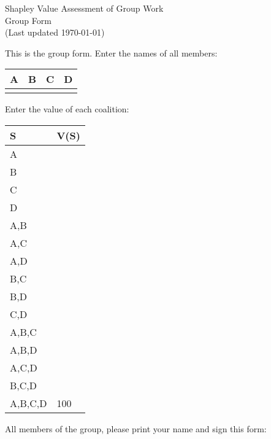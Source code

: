 \documentclass[12pt]{article}
\begin{document}
\begin{center}
\Large{Shapley Value Assessment of Group Work}\\
Group Form\\
\tiny{(Last updated \today)}
\end{center}

This is the group form. Enter the names of all members:
\vspace{1cm}

\begin{center}
\begin{tabular}{p{3cm}|p{3cm}|p{3cm}|p{3cm}}
A&B&C&D\\
\hline
&&&
\end{tabular}
\end{center}
\vspace{1cm}

Enter the value of each coalition:
\vspace{.5cm}

\begin{center}
\begin{tabular}{l|p{2cm}}
S&V(S)\\\hline
A&\\\hline
B&\\\hline
C&\\\hline
D&\\\hline
A,B&\\\hline
A,C&\\\hline
A,D&\\\hline
B,C&\\\hline
B,D&\\\hline
C,D&\\\hline
A,B,C&\\\hline
A,B,D&\\\hline
A,C,D&\\\hline
B,C,D&\\\hline
A,B,C,D&100\\\hline
\end{tabular}
\end{center}

\vspace{.5cm}

All members of the group, please print your name and sign this form:
\end{document}

